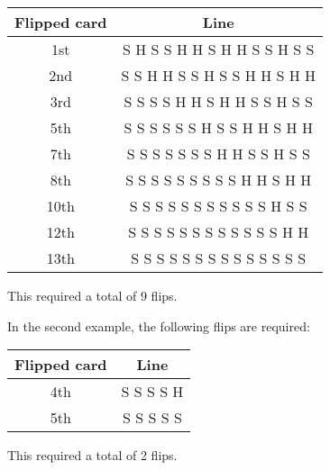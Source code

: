 \begin{inlinetable*}
    \begin{tabular}{cc}
        \toprule
        Flipped card & Line \\
        \midrule
        1st &  S H S S H H S H H S S H S S \\
        2nd &  S S H H S S H S S H H S H H \\
        3rd &  S S S S H H S H H S S H S S \\
        5th &  S S S S S S H S S H H S H H \\
        7th &  S S S S S S S H H S S H S S \\
        8th &  S S S S S S S S S H H S H H \\
        10th & S S S S S S S S S S S H S S \\
        12th & S S S S S S S S S S S S H H \\
        13th & S S S S S S S S S S S S S S \\
        \bottomrule
    \end{tabular}
\end{inlinetable*}

This required a total of 9 flips.

In the second example, the following flips are required:

\begin{inlinetable*}
    \begin{tabular}{cc}
        \toprule
        Flipped card & Line \\
        \midrule
        4th & S S S S H \\
        5th & S S S S S \\
        \bottomrule
    \end{tabular}
\end{inlinetable*}

This required a total of 2 flips.